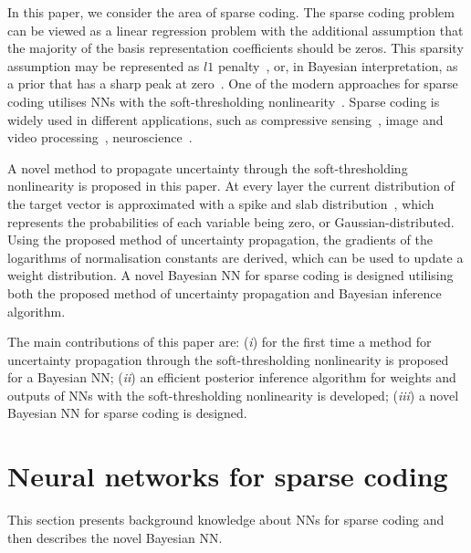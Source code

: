\documentclass{article}
\begin{document}
  In this paper, we consider the area of sparse coding. The sparse coding problem can be viewed as a linear regression problem with the additional assumption that the majority of the basis representation coefficients should be zeros. This sparsity assumption may be represented as $l1$ penalty~\cite{tibshirani1996regression}, or, in Bayesian interpretation, as a prior that has a sharp peak at zero~\cite{tipping2001sparse}. One of the modern approaches for sparse coding utilises NNs with the soft-thresholding nonlinearity~\cite{gregor2010learning, sprechmann2015learning}. Sparse coding is widely used in different applications, such as compressive sensing~\cite{candes2008introduction}, image and video processing~\cite{mairal2014sparse, wang2015deep}, neuroscience~\cite{baillet1997bayesian, jas2017learning}.

  A novel method to propagate uncertainty through the soft-thresholding nonlinearity is proposed in this paper. At every layer the current distribution of the target vector is approximated with a spike and slab distribution~\cite{mitchell1988bayesian}, which represents the probabilities of each variable being zero, or Gaussian-distributed. Using the proposed method of uncertainty propagation, the gradients of the logarithms of normalisation constants are derived, which can be used to update a weight distribution. A novel Bayesian NN for sparse coding is designed utilising both the proposed method of uncertainty propagation and Bayesian inference algorithm.

  The main contributions of this paper are: (\textit{i}) for the first time a method for uncertainty propagation through the soft-thresholding nonlinearity is proposed for a Bayesian NN; (\textit{ii}) an efficient posterior inference algorithm for weights and outputs of NNs with the soft-thresholding nonlinearity is developed; (\textit{iii}) a novel Bayesian NN for sparse coding is designed.


\section{Neural networks for sparse coding}
  \label{sec:bayesian_lista}
 This section presents background knowledge about NNs for sparse coding and then describes the novel Bayesian NN.
  
\end{document}
